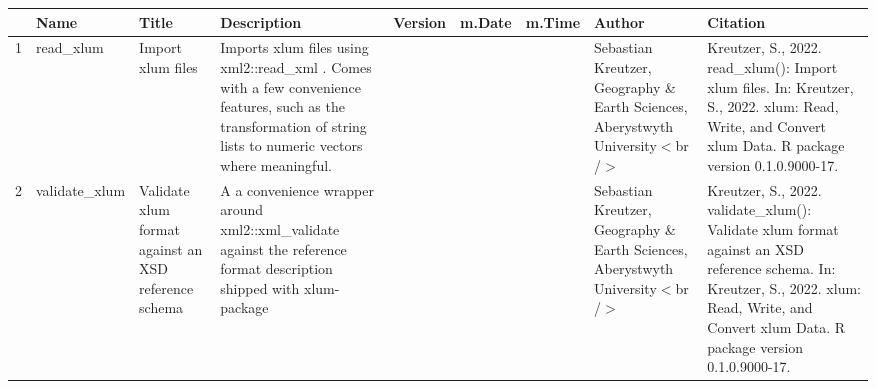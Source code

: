 \begin{table}[ht]
\centering
\begin{tabular}{rllllllll}
  \hline
 & Name & Title & Description & Version & m.Date & m.Time & Author & Citation \\ 
  \hline
1 & read\_xlum & Import xlum files & Imports xlum files using  xml2::read\_xml . Comes with a few convenience features, such as the transformation of string lists to numeric vectors where meaningful. &  &  &  & Sebastian Kreutzer, Geography \& Earth Sciences, Aberystwyth University$<$br /$>$ & Kreutzer, S., 2022. read\_xlum(): Import xlum files. In: Kreutzer, S., 2022. xlum: Read, Write, and Convert xlum Data. R package version 0.1.0.9000-17. 
 \\ 
  2 & validate\_xlum & Validate xlum format against an XSD reference schema & A a convenience wrapper around  xml2::xml\_validate  against the reference format description shipped with  xlum-package &  &  &  & Sebastian Kreutzer, Geography \& Earth Sciences, Aberystwyth University$<$br /$>$ & Kreutzer, S., 2022. validate\_xlum(): Validate xlum format against an XSD reference schema. In: Kreutzer, S., 2022. xlum: Read, Write, and Convert xlum Data. R package version 0.1.0.9000-17. 
 \\ 
   \hline
\end{tabular}
\end{table}

